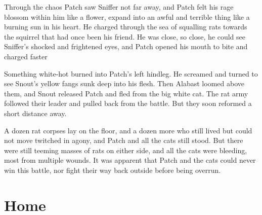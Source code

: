 \documentclass[12pt]{book}
\begin{document}
Through the chaos Patch saw Sniffer not far away, and Patch felt his rage blossom within him like a flower, expand into an awful and terrible thing like a burning sun in his heart. He charged through the sea of squalling rats towards the squirrel that had once been his friend. He was close, so close, he could see Sniffer's shocked and frightened eyes, and Patch opened his mouth to bite and charged faster %
\par
 Something white-hot burned into Patch's left hindleg. He screamed and turned to see Snout's yellow fangs sunk deep into his flesh. Then Alabast loomed above them, and Snout released Patch and fled from the big white cat. The rat army followed their leader and pulled back from the battle. But they soon reformed a short distance away.\par
 A dozen rat corpses lay on the floor, and a dozen more who still lived but could not move twitched in agony, and Patch and all the cats still stood. But there were still teeming masses of rats on either side, and all the cats were bleeding, most from multiple wounds. It was apparent that Patch and the cats could never win this battle, nor fight their way back outside before being overrun.\par

\section{Home}
\end{document}
